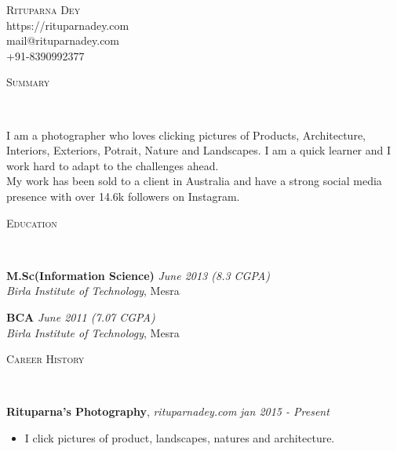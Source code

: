 \documentclass[9pt]{article}
\newenvironment{changemargin}[2]{%
  \begin{list}{}{%
    \setlength{\topsep}{0pt}%
    \setlength{\leftmargin}{#1}%
    \setlength{\rightmargin}{#2}%
    \setlength{\listparindent}{\parindent}%
    \setlength{\itemindent}{\parindent}%
    \setlength{\parsep}{\parskip}%
  }%
  \item[]}{\end{list}
}
\newcommand{\lineover}{
	\begin{changemargin}{-0.05in}{-0.05in}
		\vspace*{-8pt}
		\hrulefill \\
		\vspace*{-2pt}
	\end{changemargin}
}
\newcommand{\header}[1]{
	\begin{changemargin}{-0.5in}{-0.5in}
		\scshape{#1}\\
  	\lineover
	\end{changemargin}
}
\newcommand{\contact}[4]{
	\begin{changemargin}{-0.5in}{-0.5in}
		\begin{center}
			{\Large \scshape {#1}}\\ \smallskip
			{#2}\\ \smallskip
			{#3}\\ \smallskip
			{#4}\smallskip
		\end{center}
	\end{changemargin}
}
\newenvironment{body} {
	\vspace*{-16pt}
	\begin{changemargin}{-0.25in}{-0.5in}
  }
	{\end{changemargin}
}
\begin{document}
\contact{Rituparna Dey}{https://rituparnadey.com}{mail@rituparnadey.com}{+91-8390992377}


\header{Summary}

\begin{body}
	\vspace{14pt}
I am a photographer who loves clicking pictures of Products, Architecture, Interiors, Exteriors,
Potrait, Nature and Landscapes. I am a quick learner and I work hard to adapt to the challenges ahead.\\
My work has been sold to a client in Australia and have a strong social media presence with over 14.6k followers
on Instagram.

\end{body}

\smallskip


\header{Education}

\begin{body}
	\vspace{14pt}
  \textbf{M.Sc(Information Science)}{} \hfill \emph{June 2013 (8.3 CGPA)}{} \\
	\emph{Birla Institute of Technology}, Mesra{} \\
\end{body}

\begin{body}
	\vspace{14pt}
  \textbf{BCA }{} \hfill \emph{June 2011 (7.07 CGPA)}{} \\
	\emph{Birla Institute of Technology}, Mesra{} \\
\end{body}

\smallskip


\header{Career History}

\begin{body}
	\vspace{14pt}
	\textbf{Rituparna's Photography}, \emph{rituparnadey.com} \hfill \emph{jan 2015 - Present}\\
	\begin{itemize}
		\item I click pictures of product, landscapes, natures and architecture.
	\end{itemize}
	\vspace*{-4pt}
\end{body}
\end{document}
